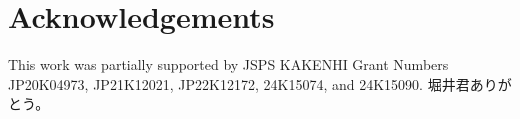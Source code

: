 \section*{Acknowledgements}
This work was partially supported by JSPS KAKENHI Grant Numbers JP20K04973, JP21K12021, JP22K12172, 24K15074, and 24K15090. 
堀井君ありがとう。
